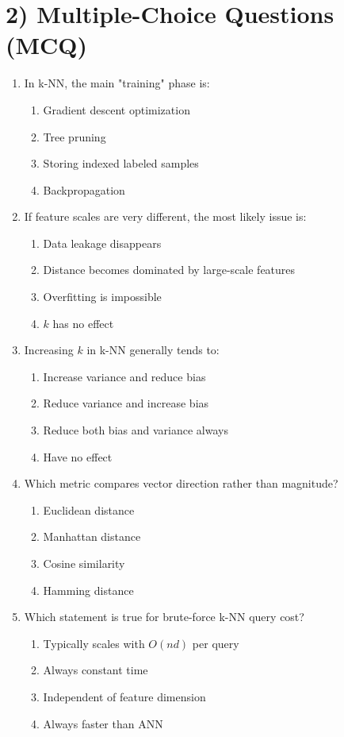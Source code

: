 \section*{2) Multiple-Choice Questions (MCQ)}
\begin{enumerate}[label=\textbf{MCQ \arabic*.}]
  \item In k-NN, the main "training" phase is:
  \begin{enumerate}[label=(\Alph*)]
    \item Gradient descent optimization
    \item Tree pruning
    \item Storing indexed labeled samples
    \item Backpropagation
  \end{enumerate}

  \item If feature scales are very different, the most likely issue is:
  \begin{enumerate}[label=(\Alph*)]
    \item Data leakage disappears
    \item Distance becomes dominated by large-scale features
    \item Overfitting is impossible
    \item $k$ has no effect
  \end{enumerate}

  \item Increasing $k$ in k-NN generally tends to:
  \begin{enumerate}[label=(\Alph*)]
    \item Increase variance and reduce bias
    \item Reduce variance and increase bias
    \item Reduce both bias and variance always
    \item Have no effect
  \end{enumerate}

  \item Which metric compares vector direction rather than magnitude?
  \begin{enumerate}[label=(\Alph*)]
    \item Euclidean distance
    \item Manhattan distance
    \item Cosine similarity
    \item Hamming distance
  \end{enumerate}

  \item Which statement is true for brute-force k-NN query cost?
  \begin{enumerate}[label=(\Alph*)]
    \item Typically scales with $O(nd)$ per query
    \item Always constant time
    \item Independent of feature dimension
    \item Always faster than ANN
  \end{enumerate}


\end{enumerate}
